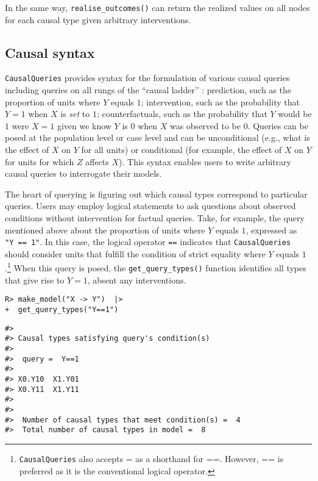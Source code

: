 \documentclass[
  11pt,
  article]{jss}
\begin{document}
In the same way, \texttt{realise\_outcomes()} can return the realized
values on all nodes for each causal type given arbitrary interventions.

\subsection{Causal syntax}\label{sec-syntax}

\texttt{CausalQueries} provides syntax for the formulation of various
causal queries including queries on all rungs of the ``causal ladder''
\citep{pearl_causality_2009}: prediction, such as the proportion of
units where \(Y\) equals \(1\); intervention, such as the probability
that \(Y = 1\) when \(X\) is \emph{set} to \(1\); counterfactuals, such
as the probability that \(Y\) would be \(1\) were \(X = 1\) given we
know \(Y\) is \(0\) when \(X\) was observed to be \(0\). Queries can be
posed at the population level or case level and can be unconditional
(e.g., what is the effect of \(X\) on \(Y\) for all units) or
conditional (for example, the effect of \(X\) on \(Y\) for units for
which \(Z\) affects \(X\)). This syntax enables users to write arbitrary
causal queries to interrogate their models.

The heart of querying is figuring out which causal types correspond to
particular queries. Users may employ logical statements to ask questions
about observed conditions without intervention for factual queries.
Take, for example, the query mentioned above about the proportion of
units where \(Y\) equals \(1\), expressed as \texttt{"Y\ ==\ 1"}. In
this case, the logical operator \texttt{==} indicates that
\texttt{CausalQueries} should consider units that fulfill the condition
of strict equality where \(Y\) equals \(1\).\footnote{\texttt{CausalQueries}
  also accepts = as a shorthand for ==. However, == is preferred as it
  is the conventional logical operator.} When this query is posed, the
\texttt{get\_query\_types()} function identifies all types that give
rise to \(Y=1\), absent any interventions.

\begin{verbatim}
R> make_model("X -> Y")  |> 
+  get_query_types("Y==1")
\end{verbatim}

\begin{verbatim}
#> 
#> Causal types satisfying query's condition(s)  
#> 
#>  query =  Y==1 
#> 
#> X0.Y10  X1.Y01
#> X0.Y11  X1.Y11
#> 
#> 
#>  Number of causal types that meet condition(s) =  4
#>  Total number of causal types in model =  8
\end{verbatim}
\end{document}
